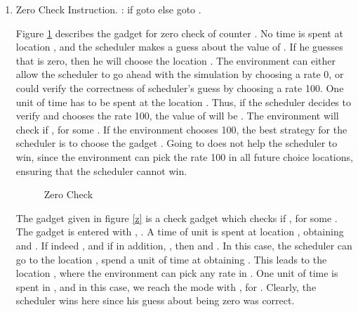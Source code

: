 \begin{enumerate}
\item Zero Check Instruction.  : if  goto  else goto .

Figure \ref{zero-check} describes the gadget for zero check 
of counter . No time is spent 
at location , and the scheduler makes  a guess about the 
value of . If he guesses that  is zero, then he will choose 
the location . The environment can either allow the scheduler to go ahead 
with the simulation by choosing a rate 0, or could verify the correctness of scheduler's guess
by choosing a rate 100.  One unit of time has to be spent at the location . 
Thus, if the scheduler decides to verify 
and chooses the rate 100, the value of  will be . 
The environment will check if , for some . 
If the environment chooses 100, the best strategy for the scheduler 
is to choose the gadget . Going to  does not help the scheduler to win, since 
the environment can pick the rate 100 in all future choice locations, ensuring that 
the scheduler cannot win. 

\begin{figure}[h]
\begin{center}
\caption{Zero Check }
\label{zero-check}
\end{center}
\end{figure}


 The gadget  given in figure \ref{z} is a check gadget which checks if , for some .  The gadget  is entered with , . A time of unit is spent at location , obtaining 
 and . If indeed , and if in addition, , then  and . In this case, 
 the scheduler can go to the location , spend a unit of time at  obtaining . 
 This leads to the location , where the environment can pick any rate in . One unit of time 
 is spent in , and in this case, we reach the mode  with , for 
 . Clearly, the scheduler wins here since his guess about  being zero was correct. 



\end{enumerate}
